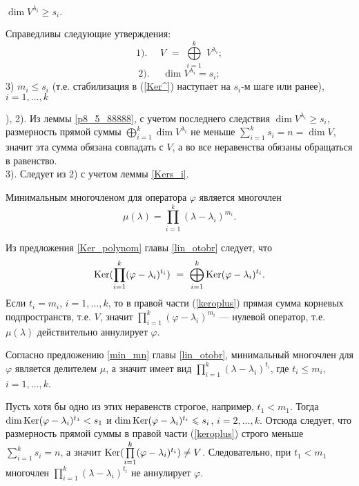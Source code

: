 \begin{sled}
$\dim V^{\lambda _i} \geq s_i.$
\end{sled}




\begin{theor} Справедливы следующие утверждения:
\begin{equation}\label{oplusV^}
1).\,\,\,\,\,\,\,\, \boxed{V\, \, = \, \, \bigoplus\limits_{i=1}^k \,\, V^{\lambda_i} };
\end{equation}
$$2).\,\,\,\,\,\,\,\, \boxed{\dim V^{\lambda_i} =  s_i};$$
3) $m_i\leq s_i$  (т.е. стабилизация в (\ref{Ker^}) наступает на $s_i$-м шаге или ранее), $i=1, \ldots, k$
\end{theor}
), 2). Из леммы \ref{p8_5_88888}, с учетом последнего следствия $\dim V^{\lambda _i} \geq s_i$,
размерность прямой суммы $\bigoplus\limits_{i=1}^k \dim V^{\lambda_i}$  не меньше $\sum\limits_{i=1}^k s_i=n = \dim V$, значит эта сумма обязана совпадать с $V$, а во все неравенства обязаны обращаться в равенство.
\\
3). Следует из 2) с учетом леммы \ref{Kers_i}.
\edok

\begin{predl}\label{minmn} 
Минимальным многочленом для оператора $\varphi$ является многочлен 
$$\mu(\lambda) = \prod_{i=1}^k (\lambda - \lambda _i)^{m_i}.$$
\end{predl}
\dok Из предложения \ref{Ker_polynom} главы \ref{lin_otobr} следует, что 
\begin{equation}\label{keroplus}
 \mathop{\rm Ker}\nolimits (\prod \limits_{i=1}^{k} (\varphi - \lambda_i)^{t_i}) \,\, = \,\,  \bigoplus\limits_{i=1}^{k} 
\mathop{\rm Ker}\nolimits (\varphi - \lambda_i)^{t_i}. 
\end{equation}
Если $t_i=m_i$, $i=1, \ldots, k$, то в правой части (\ref{keroplus}) прямая сумма корневых подпространств, т.е. $V$,
значит $\prod \limits_{i=1}^{k} (\varphi - \lambda_i)^{m_i}$ --- нулевой оператор, т.е. 
$\mu(\lambda)$ действительно аннулирует $\varphi$.

Согласно предложению \ref{min_mn} главы \ref{lin_otobr}, минимальный многочлен для $\varphi$ 
является делителем $\mu$, а значит имеет вид $\prod_{i=1}^k (\lambda - \lambda _i)^{t_i}$,
где  $t_i\leq m_i$, $i=1, \ldots, k$. 

Пусть хотя бы одно из этих неравенств строгое, например, 
$t_1< m_1$. Тогда $\mathop{\rm dim}\nolimits \mathop{\rm Ker}\nolimits (\varphi - \lambda_i)^{t_1} <s_1$ и
$\mathop{\rm dim}\nolimits \mathop{\rm Ker}\nolimits (\varphi - \lambda_i)^{t_i} \leqslant s_i$, $i=2, \ldots, k$. Отсюда следует, что 
размерность прямой суммы в правой части (\ref{keroplus}) строго меньше $\sum\limits_{i=1}^k s_i = n$, 
а значит $\mathop{\rm Ker}\nolimits (\prod \limits_{i=1}^{k} (\varphi - \lambda_i)^{t_i}) \neq V$. Следовательно, при  
$t_1< m_1$ многочлен $\prod_{i=1}^k (\lambda - \lambda _i)^{t_i}$ не аннулирует $\varphi$.
\edok 

